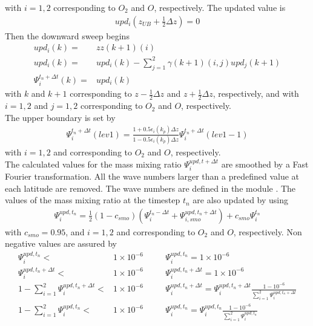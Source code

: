 %
with $i = 1, 2$ corresponding to $O_2$ and $O$, respectively. The
updated value is
%
%
\begin{align}
  upd_i(z_{UB}+\frac{1}{2}\Delta z)  = 0
\end{align}
%
Then the downward sweep begins
%
\begin{align}
   upd_i(k)  = & zz(k+1)(i) \\
   upd_i(k)  = & upd_i(k) - \sum_{j=1}^2 \gamma(k+1)(i,j)upd_j(k+1) \\
   \Psi_i^{t_n+\Delta t}(k) = & upd_i(k)
\end{align}
%
with $k$ and $k+1$ corresponding to $z-\frac{1}{2}\Delta z$ and
$z+\frac{1}{2}\Delta z$, respectively, and with $i = 1, 2$ and $j=1,
2$ corresponding to $O_2$ and $O$, respectively. \\

The upper boundary is set by
%
\begin{align}
  \Psi_i^{t_n+\Delta t}(lev1) = \frac{1 + 0.5 \epsilon_i(k_p) \Delta z}
      {1 - 0.5 \epsilon_i(k_p) \Delta z}\Psi_i^{t_n+\Delta t}(lev1-1)
\end{align}
%
with $i = 1, 2$ and corresponding to $O_2$ and $O$, respectively. \\
%
The calculated values for the mass mixing ratio $\Psi_i^{upd, t +
\Delta t}$ are smoothed by a Fast Fourier transformation. All the
wave numbers larger than a predefined value at each latitude are
removed. The wave numbers are defined in the module .
The values of the mass mixing ratio at the timestep $t_n$ are also
updated by using
%
\begin{align}
  \Psi_i^{upd,t_n} = \frac{1}{2}({1-c_{smo}})(\Psi_i^{t_n-\Delta t}+
     \Psi_{i,{smo}}^{upd,t_n+\Delta t}) + c_{smo}\Psi_i^{t_n}
\end{align}
%
with $c_{smo} = 0.95$, and $i = 1, 2$ and corresponding to $O_2$ and
$O$, respectively. Non negative values are assured by
%
\begin{align}
  \Psi_i^{upd,t_n} < & 1 \times 10^{-6} &  \quad & \Psi_i^{upd,t_n} = 1 \times
  10^{-6} \\
  \Psi_i^{upd,t_n+\Delta t} < & 1 \times 10^{-6} & \quad &\Psi_i^{upd,t_n+\Delta t} = 1 \times
  10^{-6} \\
  1-\sum_{i=1}^2 \Psi_i^{upd,t_n+\Delta t} < & 1 \times 10^{-6} &  \quad &
          \Psi_i^{upd,t_n+\Delta t} =
          \Psi_i^{upd,t_n+\Delta t}\frac{1-10^{-6}}{\sum_{i=1}^2 \Psi_i^{upd,t_n+\Delta t}} \\
  1-\sum_{i=1}^2 \Psi_i^{upd,t_n} < & 1 \times 10^{-6} &  \quad &
          \Psi_i^{upd,t_n} =
          \Psi_i^{upd,t_n}\frac{1-10^{-6}}{\sum_{i=1}^2 \Psi_i^{upd,t_n}}
\end{align}
%
